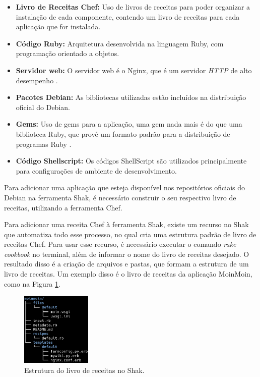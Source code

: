 \begin{itemize}
  \item  \textbf{Livro de Receitas Chef:} Uso de livros de receitas
  para poder organizar a instalação de cada componente, contendo um livro
  de receitas para cada aplicação que for instalada.
  \item  \textbf{Código Ruby:} Arquitetura desenvolvida na linguagem
  Ruby, com programação orientado a objetos.
  \item  \textbf{Servidor web:} O servidor web é o Nginx, que é um
  servidor \textit{HTTP} de alto desempenho \cite{nginx}.
  \item  \textbf{Pacotes Debian:} As bibliotecas utilizadas estão incluídos na distribuição
  oficial do Debian.
  \item  \textbf{Gems:} Uso de gems para a aplicação,
  uma gem nada mais é do que uma biblioteca Ruby, que provê um formato padrão para
  a distribuição de programas Ruby \cite{gem}.
  \item  \textbf{Código Shellscript:} Os códigos ShellScript são utilizados
  principalmente para configurações de ambiente de desenvolvimento. 
\end{itemize}

Para adicionar uma aplicação que esteja disponível nos repositórios oficiais
do Debian na ferramenta Shak, é necessário construir o seu respectivo 
livro de receitas, utilizando a ferramenta Chef. 

Para adicionar uma receita Chef à ferramenta Shak, existe um recurso no Shak que
automatiza todo esse processo, no qual cria uma estrutura padrão de livro de receitas
Chef. Para usar esse recurso, é necessário executar o comando \textit{rake cookbook}
no terminal, além de informar o nome do livro de receitas desejado. O resultado
disso é a criação de arquivos e pastas, que formam a estrutura de um livro de receitas. Um
exemplo disso é o livro de receitas da aplicação MoinMoin, como na Figura \ref{fig:x}. 

\begin{figure}[H]
  \centering
  \includegraphics[width=0.3\textwidth]
      {figuras/cookbook}
      \caption{Estrutura do livro de receitas no Shak.}
  \label{fig:x}
\end{figure}

